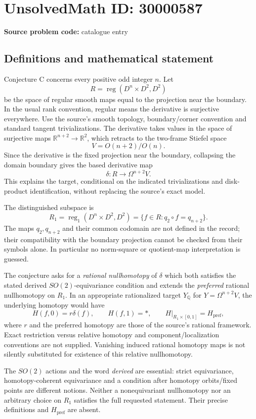 \documentclass[11pt]{article}
\newcommand{\Q}{\mathbb{Q}}
\newcommand{\R}{\mathbb{R}}
\begin{document}
\section*{UnsolvedMath ID: 30000587}
\textbf{Source problem code:} catalogue entry
\subsection{Definitions and mathematical statement}
Conjecture C concerns every positive odd integer $n$. Let
\[
 R=\operatorname{reg}(D^n\times D^2,D^2)
\]
be the space of regular smooth maps equal to the projection near the boundary. In the usual rank convention, regular means the derivative is surjective everywhere. Use the source's smooth topology, boundary/corner convention and standard tangent trivializations. The derivative takes values in the space of surjective maps $\R^{n+2}\to\R^2$, which retracts to the two-frame Stiefel space
\[
 V=O(n+2)/O(n).
\]
Since the derivative is the fixed projection near the boundary, collapsing the domain boundary gives the based derivative map
\[
 \delta:R\longrightarrow\Omega^{n+2}V.
\]
This explains the target, conditional on the indicated trivializations and disk-product identification, without replacing the source's exact model.

The distinguished subspace is
\[
 R_1=\operatorname{reg}_1(D^n\times D^2,D^2)
     =\{f\in R:q_2\circ f=q_{n+2}\}.
\]
The maps $q_2,q_{n+2}$ and their common codomain are not defined in the record; their compatibility with the boundary projection cannot be checked from their symbols alone. In particular no norm-square or quotient-map interpretation is guessed.

The conjecture asks for a \emph{rational nullhomotopy} of $\delta$ which both satisfies the stated derived $SO(2)$-equivariance condition and extends the \emph{preferred} rational nullhomotopy on $R_1$. In an appropriate rationalized target $Y_{\Q}$ for $Y=\Omega^{n+2}V$, the underlying homotopy would have
\[
 H(f,0)=r\delta(f),\qquad H(f,1)=*,\qquad
 H|_{R_1\times[0,1]}=H_{\mathrm{pref}},
\]
where $r$ and the preferred homotopy are those of the source's rational framework. Exact restriction versus relative homotopy and component/localization conventions are not supplied. Vanishing induced rational homotopy maps is not silently substituted for existence of this relative nullhomotopy.

The $SO(2)$ actions and the word \emph{derived} are essential: strict equivariance, homotopy-coherent equivariance and a condition after homotopy orbits/fixed points are different notions. Neither a nonequivariant nullhomotopy nor an arbitrary choice on $R_1$ satisfies the full requested statement. Their precise definitions and $H_{\mathrm{pref}}$ are absent.
\end{document}

